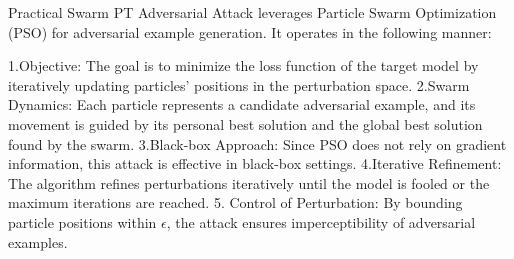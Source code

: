 Practical Swarm PT Adversarial Attack leverages Particle Swarm Optimization (PSO) for adversarial example generation. It operates in the following manner:  

1.Objective: The goal is to minimize the loss function of the target model by iteratively updating particles' positions in the perturbation space.  
2.Swarm Dynamics: Each particle represents a candidate adversarial example, and its movement is guided by its personal best solution and the global best solution found by the swarm.  
3.Black-box Approach: Since PSO does not rely on gradient information, this attack is effective in black-box settings.  
4.Iterative Refinement: The algorithm refines perturbations iteratively until the model is fooled or the maximum iterations are reached.  
5. Control of Perturbation: By bounding particle positions within $\epsilon$, the attack ensures imperceptibility of adversarial examples.
